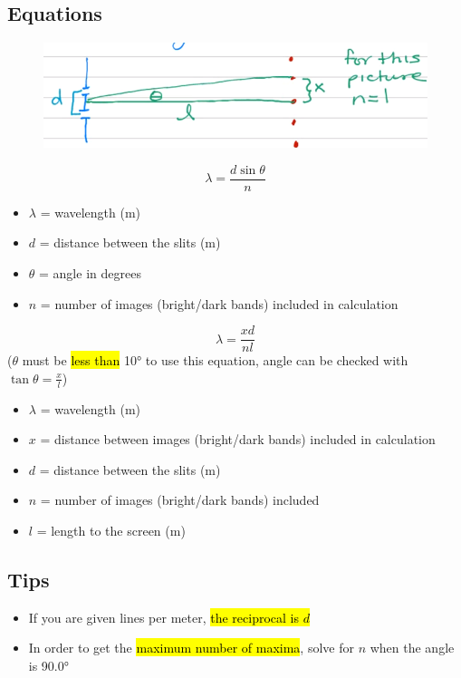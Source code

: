 \documentclass[a4paper,12pt]{article}
\begin{document}
\pagebreak
\subsection{Equations}
\begin{figure}[H]
    \centering
    \includegraphics[width=\textwidth]{lighteq}
\end{figure}

\Large $$\lambda = \frac{d\sin{\theta}}{n}$$ \normalsize
\begin{itemize}
    \item{$\lambda$ = wavelength (\si{\m})}
    \item{$d$ = distance between the slits (\si{\m})}
    \item{$\theta$ = angle in degrees}
    \item{$n$ = number of images (bright/dark bands) included in calculation}
\end{itemize}

\Large $$\lambda = \frac{xd}{nl}$$ \normalsize 
($\theta$ must be \hl{less than} \ang{10} to use this equation, angle can be checked with $\tan{\theta} = \frac{x}{l}$)
\begin{itemize}
    \item{$\lambda$ = wavelength (\si{\m})}
    \item{$x$ = distance between images (bright/dark bands) included in calculation}
    \item{$d$ = distance between the slits (\si{\m})}
    \item{$n$ = number of images (bright/dark bands) included}
    \item{$l$ = length to the screen (\si{\m})}
\end{itemize}

\subsection{Tips}
\begin{itemize}
    \item{If you are given lines per meter, \hl{the reciprocal is $d$}}
    \item{In order to get the \hl{maximum number of maxima}, solve for $n$ when the angle is \ang{90.0}}
\end{itemize}
\end{document}
